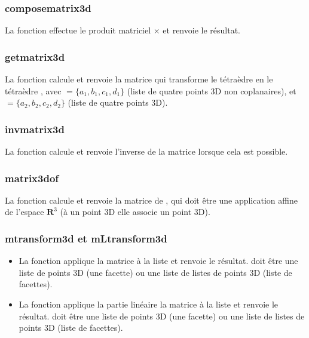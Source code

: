 \subsubsection{composematrix3d}
La fonction  effectue le produit matriciel $\times$ et renvoie le résultat.

\subsubsection{getmatrix3d}
La fonction  calcule et renvoie la matrice qui transforme le tétraèdre  en le tétraèdre , avec $=\{a_1,b_1,c_1,d_1\}$ (liste de quatre points 3D non coplanaires), et $=\{a_2,b_2,c_2,d_2\}$ (liste de quatre points 3D).

\subsubsection{invmatrix3d}
La fonction  calcule et renvoie l'inverse de la matrice  lorsque cela est possible.

\subsubsection{matrix3dof}

La fonction  calcule et renvoie la matrice de , qui doit être une application affine de l'espace $\mathbf R^3$ (à un point 3D elle associe un point 3D).


\subsubsection{mtransform3d et mLtransform3d}

\begin{itemize}
    \item La fonction  applique la matrice  à la liste  et renvoie le résultat.  doit être une liste de points 3D (une facette) ou une liste de listes de points 3D (liste de facettes).
    \item La fonction  applique la partie linéaire la matrice  à la liste  et renvoie le résultat.  doit être une liste de points 3D (une facette) ou une liste de listes de points 3D (liste de facettes).
\end{itemize}

